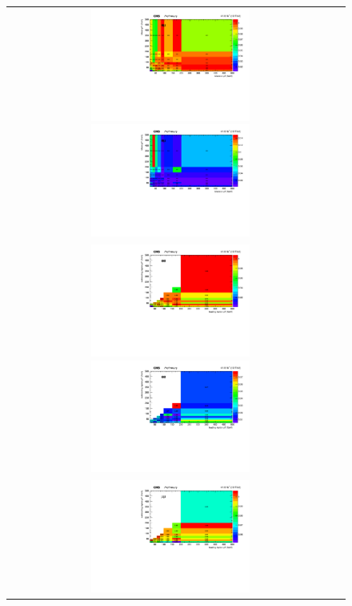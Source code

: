 \begin{figure}[h]
  \begin{center}
    \begin{tabular}{cc}
      \includegraphics[width=0.50\textwidth]{fig_2017_TrigSF/h2D_lepABpt_emu.pdf}
      \includegraphics[width=0.50\textwidth]{fig_2017_TrigSF/h2D_lepABpt_emu_BinErrors.pdf}\\       
      \includegraphics[width=0.50\textwidth]{fig_2017_TrigSF/h2D_lepABpt_ee.pdf}
      \includegraphics[width=0.50\textwidth]{fig_2017_TrigSF/h2D_lepABpt_ee_BinErrors.pdf}\\
      \includegraphics[width=0.50\textwidth]{fig_2017_TrigSF/h2D_lepABpt_mumu.pdf}

\end{tabular}
\end{center}
\end{figure}
